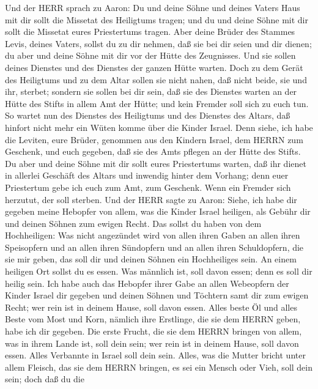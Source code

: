  Und der HERR sprach zu Aaron: Du und deine Söhne und deines
Vaters Haus mit dir sollt die Missetat des Heiligtums tragen; und du und
deine Söhne mit dir sollt die Missetat eures Priestertums tragen.
 Aber deine Brüder des Stammes Levis, deines Vaters, sollst
du zu dir nehmen, daß sie bei dir seien und dir dienen; du aber und
deine Söhne mit dir vor der Hütte des Zeugnisses.  Und sie
sollen deines Dienstes und des Dienstes der ganzen Hütte warten. Doch zu
dem Gerät des Heiligtums und zu dem Altar sollen sie nicht nahen, daß
nicht beide, sie und ihr, sterbet;  sondern sie sollen bei
dir sein, daß sie des Dienstes warten an der Hütte des Stifts in allem
Amt der Hütte; und kein Fremder soll sich zu euch tun.  So
wartet nun des Dienstes des Heiligtums und des Dienstes des Altars, daß
hinfort nicht mehr ein Wüten komme über die Kinder Israel. 
Denn siehe, ich habe die Leviten, eure Brüder, genommen aus den Kindern
Israel, dem HERRN zum Geschenk, und euch gegeben, daß sie des Amts
pflegen an der Hütte des Stifts.  Du aber und deine Söhne
mit dir sollt eures Priestertums warten, daß ihr dienet in allerlei
Geschäft des Altars und inwendig hinter dem Vorhang; denn euer
Priestertum gebe ich euch zum Amt, zum Geschenk. Wenn ein Fremder sich
herzutut, der soll sterben.  Und der HERR sagte zu Aaron:
Siehe, ich habe dir gegeben meine Hebopfer von allem, was die Kinder
Israel heiligen, als Gebühr dir und deinen Söhnen zum ewigen Recht.
 Das sollst du haben von dem Hochheiligen: Was nicht
angezündet wird von allen ihren Gaben an allen ihren Speisopfern und an
allen ihren Sündopfern und an allen ihren Schuldopfern, die sie mir
geben, das soll dir und deinen Söhnen ein Hochheiliges sein.
 An einem heiligen Ort sollst du es essen. Was männlich
ist, soll davon essen; denn es soll dir heilig sein.  Ich
habe auch das Hebopfer ihrer Gabe an allen Webeopfern der Kinder Israel
dir gegeben und deinen Söhnen und Töchtern samt dir zum ewigen Recht;
wer rein ist in deinem Hause, soll davon essen.  Alles
beste Öl und alles Beste vom Most und Korn, nämlich ihre Erstlinge, die
sie dem HERRN geben, habe ich dir gegeben.  Die erste
Frucht, die sie dem HERRN bringen von allem, was in ihrem Lande ist,
soll dein sein; wer rein ist in deinem Hause, soll davon essen.
 Alles Verbannte in Israel soll dein sein. 
Alles, was die Mutter bricht unter allem Fleisch, das sie dem HERRN
bringen, es sei ein Mensch oder Vieh, soll dein sein; doch daß du die
